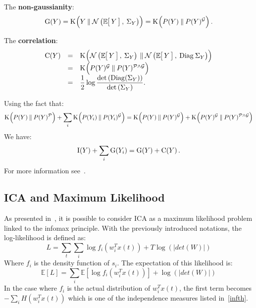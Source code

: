 \documentclass[a4paper]{article}
\newcommand{\Kl}[3][]{\mathrm K_{#1}\!\zp{#2\:\|\:#3}}
\newcommand{\zZ}[2]{\mathrm #1\!\zp{#2}}
\newcommand{\zD}{\mathcal}
\newcommand{\Ng}[2]{\mathcal{N}\zp{#1,\:#2}}
\begin{document}
The \textbf{non-gaussianity}:
\begin{equation}
  \zZ GY = \Kl{Y}{\Ng{\zesp Y}{\Sigma_Y}\zpbig2} = \Kl {\zpbig2 P(Y)}{P(Y)^{\zD G}}.
\end{equation}

The \textbf{correlation}:
\begin{equation}\begin{array}{rcl}
  \zZ CY &=& \displaystyle\Kl{\Ng{\zesp Y}{\Sigma_Y}\zpbig2}{\Ng{\zesp Y}{\mathrm{Diag}\:\Sigma_Y}}\\
  &=&\Kl{\zpbig2 P(Y)^{\zD G}}{P(Y)^{\zD P\wedge\zD G}}\\
  &=& \displaystyle\frac 12\log\frac{\det\zp{\mathrm{Diag}(\Sigma_Y)}}{\det\zp{\Sigma_Y}}.
\end{array}\end{equation}

Using the fact that:
\begin{equation}
\Kl {\zpbig2 P(Y)}{P(Y)^{\zD P}}+\sum_i \Kl {\zpbig2 P(Y_i)}{P(Y_i)^{\zD G}} = \Kl {\zpbig2 P(Y)}{P(Y)^{\zD G}} + \Kl{\zpbig2 P(Y)^{\zD G}}{P(Y)^{\zD P\wedge\zD G}}
\end{equation}
We have:
\begin{equation}
        \zZ IY + \sum_i\zZ G{Y_i} = \zZ GY + \zZ CY.
\end{equation}
For more information see~\cite{cardoso2003}.

\subsection{ICA and Maximum Likelihood}
As presented in~\cite{hyvarinen2000}, it is possible to consider ICA as a maximum likelihood problem linked to the infomax principle. 
With the previously introduced notations, the log-likelihood is defined as:
\begin{equation}
L = \sum_t \sum_i \log f_i(w_i^Tx(t))+T\log(|det(W)|)
\end{equation}
Where $f_i$ is the density function of $s_i$. The expectation of this likelihood is:
\begin{equation}
\mathbb{E}[L] = \sum_i \mathbb{E}[\log f_i(w_i^Tx(t))]+\log(|det(W)|)
\end{equation}
In the case where $f_i$ is the actual distribution of $w_i^Tx(t)$, the first term becomes $-\sum_i H(w_i^Tx(t))$ which is one of the independence measures listed in~\ref{infth}.

\end{document}
